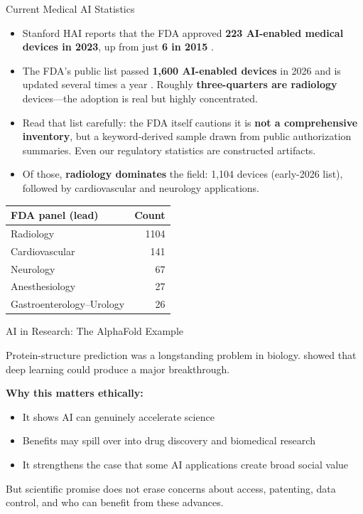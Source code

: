 \documentclass[aspectratio=169,11pt]{beamer}
\begin{document}
\begin{frame}{Current Medical AI Statistics}
\begin{itemize}
    \item Stanford HAI reports that the FDA approved \textbf{223 AI-enabled medical devices in 2023}, up from just \textbf{6 in 2015} \parencite{stanford_ai_index_2025}.
    \item The FDA's public list passed \textbf{1,600 AI-enabled devices} in 2026 and is updated several times a year \parencite{fda_ai_medical_devices_2026}. Roughly \textbf{three-quarters are radiology} devices---the adoption is real but highly concentrated.
    \item Read that list carefully: the FDA itself cautions it is \textbf{not a comprehensive inventory}, but a keyword-derived sample drawn from public authorization summaries. Even our regulatory statistics are constructed artifacts.
    \item Of those, \textbf{radiology dominates} the field: 1,104 devices (early-2026 list), followed by cardiovascular and neurology applications.
\end{itemize}

\begin{table}[h]
\centering
\scriptsize
\begin{tabular}{@{}lr@{}}
\toprule
\textbf{FDA panel (lead)} & \textbf{Count} \\
\midrule
Radiology & 1104 \\
Cardiovascular & 141 \\
Neurology & 67 \\
Anesthesiology & 27 \\
Gastroenterology--Urology & 26 \\
\bottomrule
\end{tabular}
\end{table}
\end{frame}

\begin{frame}{AI in Research: The AlphaFold Example}
\begin{quotebox}
Protein-structure prediction was a longstanding problem in biology. \textcite{jumper_alphafold_2021} showed that deep learning could produce a major breakthrough.
\end{quotebox}

\vspace{0.2cm}
\textbf{Why this matters ethically:}
\begin{itemize}
    \item It shows AI can genuinely accelerate science
    \item Benefits may spill over into drug discovery and biomedical research
    \item It strengthens the case that some AI applications create broad social value
\end{itemize}

\vspace{0.2cm}
But scientific promise does not erase concerns about access, patenting, data control, and who can benefit from these advances.
\end{frame}
\end{document}
